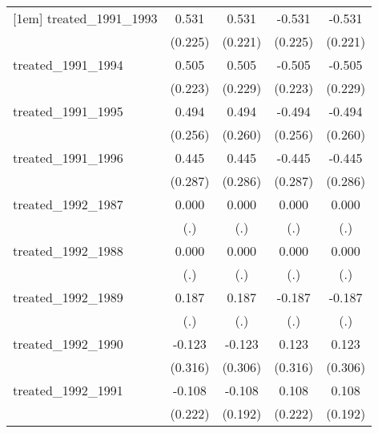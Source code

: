 {\begin{tabular}{l*{4}{c}}
[1em]
treated\_1991\_1993&       0.531\sym{*}  &       0.531\sym{*}  &      -0.531\sym{*}  &      -0.531\sym{*}  \\
            &     (0.225)         &     (0.221)         &     (0.225)         &     (0.221)         \\
[1em]
treated\_1991\_1994&       0.505\sym{*}  &       0.505\sym{*}  &      -0.505\sym{*}  &      -0.505\sym{*}  \\
            &     (0.223)         &     (0.229)         &     (0.223)         &     (0.229)         \\
[1em]
treated\_1991\_1995&       0.494         &       0.494         &      -0.494         &      -0.494         \\
            &     (0.256)         &     (0.260)         &     (0.256)         &     (0.260)         \\
[1em]
treated\_1991\_1996&       0.445         &       0.445         &      -0.445         &      -0.445         \\
            &     (0.287)         &     (0.286)         &     (0.287)         &     (0.286)         \\
[1em]
treated\_1992\_1987&       0.000         &       0.000         &       0.000         &       0.000         \\
            &         (.)         &         (.)         &         (.)         &         (.)         \\
[1em]
treated\_1992\_1988&       0.000         &       0.000         &       0.000         &       0.000         \\
            &         (.)         &         (.)         &         (.)         &         (.)         \\
[1em]
treated\_1992\_1989&       0.187         &       0.187         &      -0.187         &      -0.187         \\
            &         (.)         &         (.)         &         (.)         &         (.)         \\
[1em]
treated\_1992\_1990&      -0.123         &      -0.123         &       0.123         &       0.123         \\
            &     (0.316)         &     (0.306)         &     (0.316)         &     (0.306)         \\
[1em]
treated\_1992\_1991&      -0.108         &      -0.108         &       0.108         &       0.108         \\
            &     (0.222)         &     (0.192)         &     (0.222)         &     (0.192)         \\

\end{tabular}}
